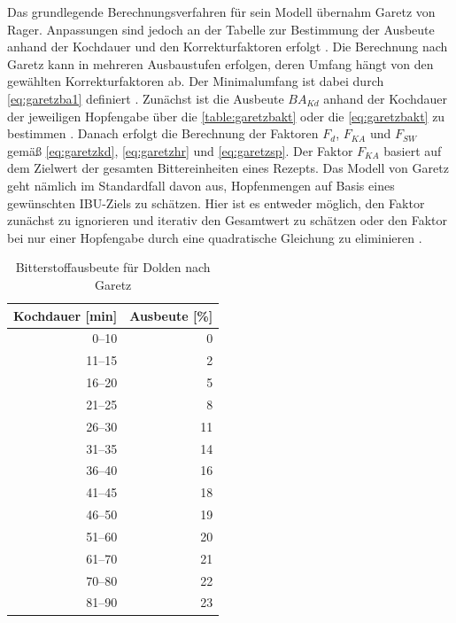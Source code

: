\documentclass[a4paper,parskip=half]{scrartcl}
\newcommand{\BAKt}{{\mathit{BA}}_{\mathit{Kd}}}
\newcommand{\FKd}{F_{\mathit{d}}}
\newcommand{\FHR}{F_{\mathit{KA}}}
\newcommand{\FSP}{F_{\mathit{SW}}}
\begin{document}
Das grundlegende Berechnungsverfahren für sein Modell übernahm Garetz von Rager. Anpassungen sind jedoch an der Tabelle zur Bestimmung der Ausbeute anhand der Kochdauer und den Korrekturfaktoren erfolgt \parencite[134-144]{Garetz1994}. Die Berechnung nach Garetz kann in mehreren Ausbaustufen erfolgen, deren Umfang hängt von den gewählten Korrekturfaktoren ab. Der Minimalumfang ist dabei durch \autoref{eq:garetzba1} definiert \parencite[137]{Garetz1994}. Zunächst ist die Ausbeute $\BAKt$ anhand der Kochdauer der jeweiligen Hopfengabe über die \autoref{table:garetzbakt} oder die \autoref{eq:garetzbakt} zu bestimmen \parencite{Steinmeyer2021}. Danach erfolgt die Berechnung der Faktoren $\FKd$, $\FHR$ und $\FSP$ gemäß \autoref{eq:garetzkd}, \autoref{eq:garetzhr} und \autoref{eq:garetzsp}. Der Faktor $\FHR$ basiert auf dem Zielwert der gesamten Bittereinheiten eines Rezepts. Das Modell von Garetz geht nämlich im Standardfall davon aus, Hopfenmengen auf Basis eines gewünschten IBU-Ziels zu schätzen. Hier ist es entweder möglich, den Faktor zunächst zu ignorieren und iterativ den Gesamtwert zu schätzen oder den Faktor bei nur einer Hopfengabe durch eine quadratische Gleichung zu eliminieren \parencite[63]{Hall1997}.

\begin{table}[H]
\centering
\begin{tabular}{rr}
\toprule
\multicolumn{1}{c}{\textbf{Kochdauer [min]}} & \multicolumn{1}{c}{\textbf{Ausbeute [\%]}} \\
\midrule
0–10            & 0 \\
11–15           & 2 \\
16–20           & 5 \\
21–25           & 8 \\
26–30           & 11 \\
31–35           & 14 \\
36–40           & 16 \\
41–45           & 18 \\
46–50           & 19 \\
51–60           & 20 \\
61–70           & 21 \\
70–80           & 22 \\
81–90           & 23 \\
\bottomrule
\end{tabular}
\caption{Bitterstoffausbeute für Dolden nach Garetz \parencite[138]{Garetz1994}}
\label{table:garetzbakt}
\end{table}
\end{document}
